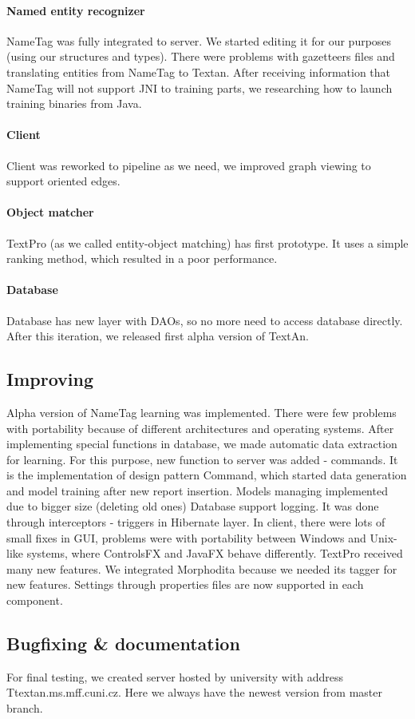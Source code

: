 \paragraph{Named entity recognizer} NameTag was fully integrated to server. We started editing it for our purposes (using our structures and types). There were problems with gazetteers files and translating entities from NameTag to Textan.
After receiving information that NameTag will not support JNI to training parts, we researching how to launch training binaries from Java.
\paragraph{Client} Client was reworked to pipeline as we need, we improved graph viewing to support oriented edges.
\paragraph{Object matcher} TextPro (as we called entity-object matching) has first prototype. It uses a simple ranking method, which resulted in a poor performance. 
\paragraph{Database} Database has new layer with DAOs, so no more need to access database directly.
After this iteration, we released first alpha version of TextAn.

\subsection{Improving}
Alpha version of NameTag learning was implemented. There were few problems with portability because of different architectures and operating systems. After implementing special functions in database, we made automatic data extraction for learning. For this purpose, new function to server was added - commands. It is the implementation of design pattern Command, which started data generation and model training after new report insertion. Models managing implemented due to bigger size (deleting old ones) 
Database support logging. It was done through interceptors - triggers in Hibernate layer.
In client, there were lots of small fixes in GUI, problems were with portability between Windows and Unix-like systems, where ControlsFX and JavaFX behave differently.
TextPro received many new features. We integrated Morphodita because we needed its tagger for new features.
Settings through properties files are now supported in each component.

\subsection{Bugfixing \& documentation}
For final testing, we created server hosted by university with address Ttextan.ms.mff.cuni.cz. Here we always have the newest version from master branch.